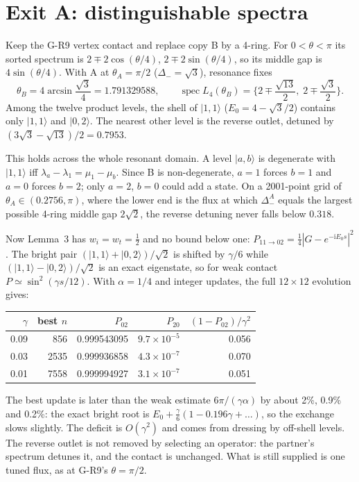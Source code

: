 \documentclass[11pt,a4paper]{article}
\newcommand{\ii}{\mathrm i}
\newcommand{\ket}[1]{|#1\rangle}
\newcommand{\spec}{\operatorname{spec}}
\begin{document}
\section{Exit A: distinguishable spectra}
Keep the G-R9 vertex contact and replace copy B by a 4-ring. For
$0<\theta<\pi$ its sorted spectrum is
$2\mp2\cos(\theta/4)$, $2\mp2\sin(\theta/4)$, so its middle gap is
$4\sin(\theta/4)$. With A at $\theta_A=\pi/2$ ($\Delta_-=\sqrt3$),
resonance fixes
\begin{equation}
 \theta_B=4\arcsin\frac{\sqrt3}{4}=1.791329588,\qquad
 \spec L_4(\theta_B)=\Big\{2\mp\frac{\sqrt{13}}2,\;2\mp\frac{\sqrt3}2\Big\}.
\end{equation}
Among the twelve product levels, the shell of $\ket{1,1}$
($E_0=4-\sqrt3/2$) contains only $\ket{1,1}$ and $\ket{0,2}$. The nearest
other level is the reverse outlet, detuned by $(3\sqrt3-\sqrt{13})/2=0.7953$.

This holds across the whole resonant domain. A level $\ket{a,b}$ is
degenerate with $\ket{1,1}$ iff $\lambda_a-\lambda_1=\mu_1-\mu_b$. Since B
is non-degenerate, $a=1$ forces $b=1$ and $a=0$ forces $b=2$; only $a=2$,
$b=0$ could add a state. On a 2001-point grid of
$\theta_A\in(0.2756,\pi)$, where the lower end is the flux at which
$\Delta_-^A$ equals the largest possible 4-ring middle gap $2\sqrt2$, the
reverse detuning never falls below $0.318$.

Now Lemma~3 has $w_i=w_t=\tfrac12$ and no bound below one:
$P_{11\to02}=\tfrac14|G-e^{-\ii E_0s}|^2$. The bright pair
$(\ket{1,1}+\ket{0,2})/\sqrt2$ is shifted by $\gamma/6$ while
$(\ket{1,1}-\ket{0,2})/\sqrt2$ is an exact eigenstate, so for weak contact
$P\simeq\sin^2(\gamma s/12)$. With $\alpha=1/4$ and integer updates, the
full $12\times12$ evolution gives:
\begin{center}
\begin{tabular}{rrrrr}\toprule
$\gamma$ & best $n$ & $P_{02}$ & $P_{20}$ & $(1-P_{02})/\gamma^2$\\\midrule
0.09 & 856 & 0.999543095 & $9.7\times10^{-5}$ & 0.056\\
0.03 & 2535 & 0.999936858 & $4.3\times10^{-7}$ & 0.070\\
0.01 & 7558 & 0.999994927 & $3.1\times10^{-7}$ & 0.051\\\bottomrule
\end{tabular}
\end{center}
The best update is later than the weak estimate $6\pi/(\gamma\alpha)$
by about 2\%, 0.9\% and 0.2\%: the exact bright root is
$E_0+\tfrac\gamma6(1-0.196\gamma+\dots)$, so the exchange slows slightly. The deficit is $O(\gamma^2)$ and comes from dressing by
off-shell levels. The reverse outlet is not removed by selecting an
operator: the partner's spectrum detunes it, and the contact is unchanged.
What is still supplied is one tuned flux, as at G-R9's $\theta=\pi/2$.
\end{document}
